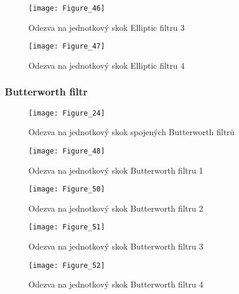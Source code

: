 \begin{figure}[H] 
	\centering
	\texttt{[image: Figure\_46]}
	\caption{Odezva na jednotkový skok Elliptic filtru 3}
\end{figure}

\begin{figure}[H] 
	\centering
	\texttt{[image: Figure\_47]}
	\caption{Odezva na jednotkový skok Elliptic filtru 4}
\end{figure}


\subsubsection{Butterworth filtr}

\begin{figure}[H] 
	\centering
	\texttt{[image: Figure\_24]}
	\caption{Odezva na jednotkový skok spojených Butterworth filtrů}
\end{figure}

\begin{figure}[H] 
	\centering
	\texttt{[image: Figure\_48]}
	\caption{Odezva na jednotkový skok Butterworth filtru 1}
\end{figure}

\begin{figure}[H] 
	\centering
	\texttt{[image: Figure\_50]}
	\caption{Odezva na jednotkový skok Butterworth filtru 2}
\end{figure}

\begin{figure}[H] 
	\centering
	\texttt{[image: Figure\_51]}
	\caption{Odezva na jednotkový skok Butterworth filtru 3}
\end{figure}

\begin{figure}[H] 
	\centering
	\texttt{[image: Figure\_52]}
	\caption{Odezva na jednotkový skok Butterworth filtru 4}
\end{figure}
